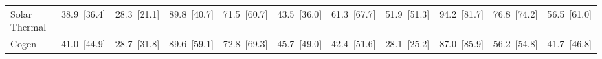 \begin{tabular}{@{}l r r r r r  r r r r r @{}}
Solar Thermal & 38.9~{\color{seasoncol}\scriptsize[36.4]} & 28.3~{\color{seasoncol}\scriptsize[21.1]} & 89.8~{\color{seasoncol}\scriptsize[40.7]} & 71.5~{\color{seasoncol}\scriptsize[60.7]} & 43.5~{\color{seasoncol}\scriptsize[36.0]} & 61.3~{\color{seasoncol}\scriptsize[67.7]} & 51.9~{\color{seasoncol}\scriptsize[51.3]} & 94.2~{\color{seasoncol}\scriptsize[81.7]} & 76.8~{\color{seasoncol}\scriptsize[74.2]} & 56.5~{\color{seasoncol}\scriptsize[61.0]} \\
Cogen & 41.0~{\color{seasoncol}\scriptsize[44.9]} & 28.7~{\color{seasoncol}\scriptsize[31.8]} & 89.6~{\color{seasoncol}\scriptsize[59.1]} & 72.8~{\color{seasoncol}\scriptsize[69.3]} & 45.7~{\color{seasoncol}\scriptsize[49.0]} & 42.4~{\color{seasoncol}\scriptsize[51.6]} & 28.1~{\color{seasoncol}\scriptsize[25.2]} & 87.0~{\color{seasoncol}\scriptsize[85.9]} & 56.2~{\color{seasoncol}\scriptsize[54.8]} & 41.7~{\color{seasoncol}\scriptsize[46.8]} \\
\bottomrule
\end{tabular}
